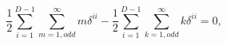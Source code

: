 \begin{equation}
\frac{1}{2}\sum_{i=1}^{D-1}\sum_{m=1,odd}^{\infty}m
\delta^{ii}-\frac{1}{2}\sum_{i=1}^{D-1}\sum_{k=1,odd}^{\infty}k\delta^{ii}=0,
\end{equation}

